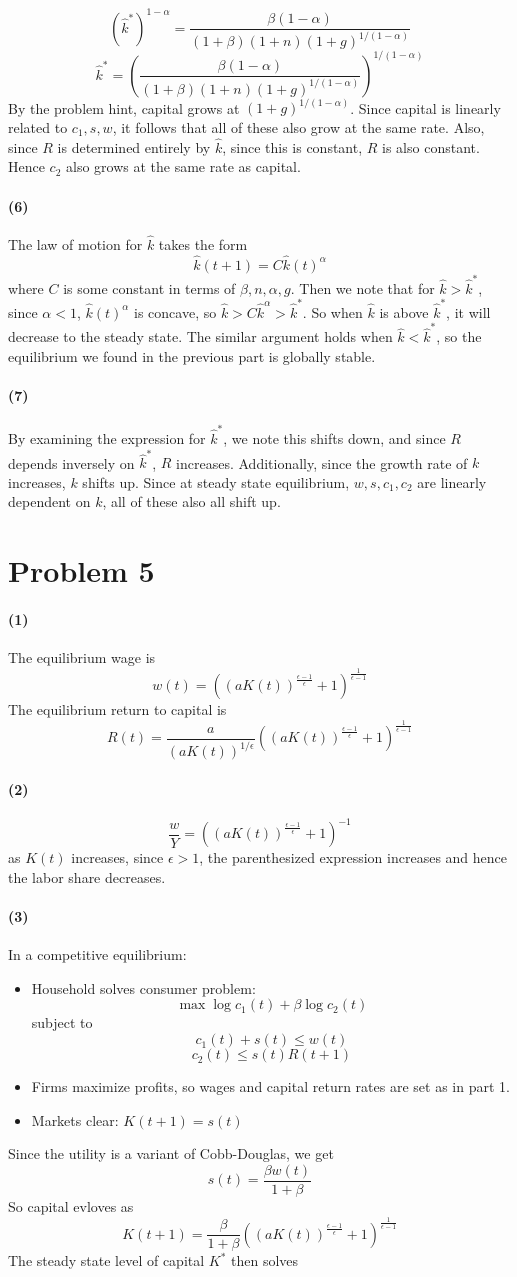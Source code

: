 \documentclass[10pt,letter]{article}
\newcommand{\problem}[1]{\section*{Problem #1}}
\newcommand{\problempart}[1]{\paragraph{#1}}
\begin{document}
\[ (\hat{k}^*)^{1-\alpha}  = \frac{\beta (1-\alpha) }{(1+\beta)(1+n)(1+g)^{1/(1-\alpha)}} \]
\[\hat{k}^*   = \left(\frac{\beta (1-\alpha) }{(1+\beta)(1+n)(1+g)^{1/(1-\alpha)}} \right)^{1/(1-\alpha)} \]
By the problem hint, capital grows at $(1+g)^{1/(1-\alpha)}$. Since capital is linearly related to $c_1, s, w$, it follows that all of these also grow at the same rate. Also, since $R$ is determined entirely by $\hat{k}$, since this is constant, $R$ is also constant. Hence $c_2$ also grows at the same rate as capital.
\problempart{(6)}
The law of motion for $\hat{k}$ takes the form
\[ \hat{k}(t+1) = C\hat{k}(t)^\alpha \]
where $C$ is some constant in terms of $\beta, n, \alpha, g$. Then we note that for $\hat{k} > \hat{k}^*$, since $\alpha < 1$, $\hat{k}(t)^\alpha$ is concave, so $ \hat{k} > C\hat{k}^\alpha > \hat{k}^*$. So when $\hat{k}$ is above $\hat{k}^*$, it will decrease to the steady state. The similar argument holds when $\hat{k} < \hat{k}^*$, so the equilibrium we found in the previous part is globally stable.
\problempart{(7)}
By examining the expression for $\hat{k}^*$, we note this shifts down, and since $R$ depends inversely on $\hat{k}^*$, $R$ increases. Additionally, since the growth rate of $k$ increases, $k$ shifts up. Since at steady state equilibrium, $w, s, c_1, c_2$ are linearly dependent on $k$, all of these also all shift up.
\pagebreak
\problem{5}

\problempart{(1)}
The equilibrium wage is
\[ w(t) = \left( (aK(t))^{\frac{\epsilon-1}{\epsilon}} + 1 \right)^{\frac{1}{\epsilon - 1}} \]
The equilibrium return to capital is
\[ R(t) = \frac{a}{(aK(t))^{1/\epsilon}}\left( (aK(t))^{\frac{\epsilon-1}{\epsilon}} + 1 \right)^{\frac{1}{\epsilon - 1}} \]
\problempart{(2)}
\[ \frac{w}{Y} = \left( (aK(t))^{\frac{\epsilon-1}{\epsilon}} + 1 \right)^{-1} \]
as $K(t)$ increases, since $\epsilon > 1$, the parenthesized expression increases and hence the labor share decreases.
\problempart{(3)}
In a competitive equilibrium:
\begin{itemize}
  \item Household solves consumer problem:
  \[ \max \log c_1(t) + \beta \log c_2(t) \]
  subject to
  \[ c_1(t) + s(t) \le w(t) \]
  \[ c_2(t) \le s(t)R(t+1) \]
  \item Firms maximize profits, so wages and capital return rates are set as in part 1.
  \item Markets clear: $K(t+1) = s(t)$
\end{itemize}
Since the utility is a variant of Cobb-Douglas, we get
\[ s(t) = \frac{\beta w(t)}{1+\beta} \]
So capital evloves as
\[ K(t+1) = \frac{\beta}{1+\beta} \left( (aK(t))^{\frac{\epsilon-1}{\epsilon}} + 1 \right)^{\frac{1}{\epsilon - 1}} \]
The steady state level of capital $K^*$ then solves
\end{document}
